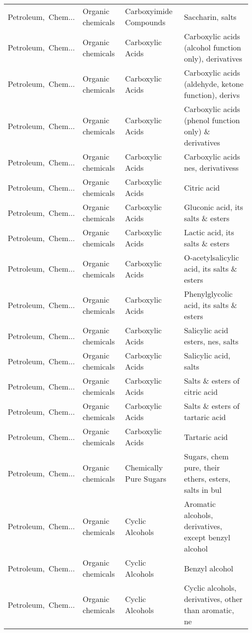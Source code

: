 \begin{appendices}
\begin{xltabular}{\textwidth}{|p{0.10\textwidth}|p{0.25\textwidth}|p{0.24\textwidth}|p{0.31\textwidth}|}
Petroleum,\ Chem... & Organic chemicals & Carboxyimide Compounds & Saccharin, salts \\
Petroleum,\ Chem... & Organic chemicals & Carboxylic Acids & Carboxylic acids (alcohol function only), derivatives \\
Petroleum,\ Chem... & Organic chemicals & Carboxylic Acids & Carboxylic acids (aldehyde, ketone function), derivs \\
Petroleum,\ Chem... & Organic chemicals & Carboxylic Acids & Carboxylic acids (phenol function only) \& derivatives \\
Petroleum,\ Chem... & Organic chemicals & Carboxylic Acids & Carboxylic acids nes, derivativess \\
Petroleum,\ Chem... & Organic chemicals & Carboxylic Acids & Citric acid \\
Petroleum,\ Chem... & Organic chemicals & Carboxylic Acids & Gluconic acid, its salts \& esters \\
Petroleum,\ Chem... & Organic chemicals & Carboxylic Acids & Lactic acid, its salts \& esters \\
Petroleum,\ Chem... & Organic chemicals & Carboxylic Acids & O-acetylsalicylic acid, its salts \& esters \\
Petroleum,\ Chem... & Organic chemicals & Carboxylic Acids & Phenylglycolic acid, its salts \& esters \\
Petroleum,\ Chem... & Organic chemicals & Carboxylic Acids & Salicylic acid esters, nes, salts \\
Petroleum,\ Chem... & Organic chemicals & Carboxylic Acids & Salicylic acid, salts \\
Petroleum,\ Chem... & Organic chemicals & Carboxylic Acids & Salts \& esters of citric acid \\
Petroleum,\ Chem... & Organic chemicals & Carboxylic Acids & Salts \& esters of tartaric acid \\
Petroleum,\ Chem... & Organic chemicals & Carboxylic Acids & Tartaric acid \\
Petroleum,\ Chem... & Organic chemicals & Chemically Pure Sugars & Sugars, chem pure, their ethers, esters, salts in bul \\
Petroleum,\ Chem... & Organic chemicals & Cyclic Alcohols & Aromatic alcohols, derivatives, except benzyl alcohol \\
Petroleum,\ Chem... & Organic chemicals & Cyclic Alcohols & Benzyl alcohol \\
Petroleum,\ Chem... & Organic chemicals & Cyclic Alcohols & Cyclic alcohols, derivatives, other than aromatic, ne \\

\end{xltabular}
\end{appendices}
